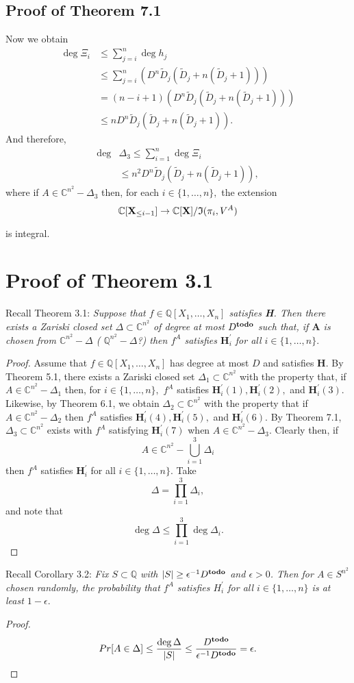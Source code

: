 \documentclass[sigconf]{acmart}
\def\td{{\bf todo}}
\def\C{\mathbb{C}}
\def\Q{\mathbb{Q}}
\def\Dt{\widetilde{D}}
\def\D{\Delta}
\begin{document}
\subsection{Proof of Theorem 7.1}
%
Now we obtain
%
\begin{align*}
    \deg \Xi_i 
    &\leq \sum_{j=i}^n \deg h_j\\
    &\leq  \sum_{j=i}^n \left( D^n\Dt_j\left(\Dt_j + n\left(\Dt_j+1\right) \right) \right) \\
    &=  (n-i+1)\left( D^n\Dt_j\left(\Dt_j + n\left(\Dt_j+1\right) \right) \right)\\
    &\leq  n D^n\Dt_j\left(\Dt_j + n\left(\Dt_j+1\right) \right) .
\end{align*}
%
And therefore,  
%
\begin{align*}
    \deg& \Delta_3 \leq \sum_{i=1}^n \deg \Xi_i\\
    &\leq n^2 D^n\Dt_j\left(\Dt_j + n\left(\Dt_j+1\right) \right),
\end{align*}
%
where if $A \in \C^{n^2} - \Delta_3$ then, for each $i \in \{1,\hdots,n\},$ the extension 
\[
\C[\textbf{X}_{\leq i-1}]\rightarrow\C[\textbf{X}]/\frak{I}(\pi_i,V^A)
\]

is integral.
%
%
%
%
\section{Proof of Theorem 3.1}
%
Recall Theorem 3.1: \textit{Suppose that $f \in \Q[X_1,\hdots,X_n]$ satisfies \textbf{H}. Then there exists a Zariski closed set $\D \subset \mathbb{C}^{n^2}$ of degree at most $D^{\textrm{\td}}$ such that, if $\textbf{A}$ is chosen from  $\C^{n^2}-\Delta$ ( $\Q^{n^2}-\Delta$?) then $f^A$ satisfies $\textbf{H}_i^{'}$ for all $i \in \{1,\hdots,n\}.$} 
%
\begin{proof}
Assume that $f\in \Q[X_1,\hdots,X_n]$ has degree at most $D$ and satisfies $\textbf{H}.$ By Theorem 5.1, there exists a Zariski closed set $\D_1\subset \C^{n^2}$ with the property that, if $A \in \C^{n^2}-\D_1$ then, for $i \in \{1,\hdots,n\},$ $f^A$ satisfies $\textbf{H}_i^{'}(1), \textbf{H}_i^{'}(2),$ and $\textbf{H}_i^{'}(3).$ Likewise, by Theorem 6.1, we obtain $\D_2 \subset \C^{n^2}$ with the property that if $A \in \C^{n^2}-\D_2$ then $f^A$ satisfies $\textbf{H}_i^{'}(4), \textbf{H}_i^{'}(5),$ and $\textbf{H}_i^{'}(6).$ By Theorem 7.1, $\D_3 \subset \C^{n^2}$ exists with $f^A$ satisfying $\textbf{H}_i^{'}(7)$ when $A \in \C^{n^2}-\D_3$. Clearly then, if 
\[
A \in \C^{n^2} - \bigcup_{i=1}^3 \D_i
\]
then $f^A$ satisfies  $\textbf{H}_i^{'}$ for all $i \in \{1,\hdots,n\}.$ Take 
\[
\Delta = \prod_{i=1}^3 \D_i,
\]
and note that 
\[
\deg \D \leq  \prod_{i=1}^3 \deg \D_i.
\]
\end{proof}
%
Recall Corollary 3.2: \textit{Fix $S \subset \mathbb{Q}$ with $|S| \geq \epsilon^{-1} D^{\textrm{\td}}$ and $\epsilon > 0$. Then for $A\in S^{n^2}$ chosen randomly, the probability that $f^A$ satisfies $H_i^{'}$ for all $i \in \{1,\hdots,n\}$ is at least $1-\epsilon.$}
%
\begin{proof}
\[
Pr[A \in \Delta] \leq \frac{\deg \Delta}{|S|} \leq \frac{D^{\td}}{\epsilon^{-1}D^{\td}} = \epsilon.
\]
\end{proof}
%
%
%
%
\end{document}
